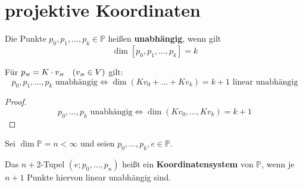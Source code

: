 \documentclass[parskip,a4paper,twoside,DIV15,BCOR12mm]{scrbook}
\begin{document}
\section{projektive Koordinaten}
\begin{definition}
Die Punkte \(p_{0},p_{1},\ldots,p_{k}\in\mathbb{P}\) heißen 
\textbf{unabhängig}, wenn gilt
\[
\dim[p_{0},p_{1},\ldots,p_{k}]=k
\]
\end{definition}
\begin{lemma}
Für \(p_{\varkappa}=K\cdot v_{\varkappa}\quad(v_{\varkappa}\in V)\) gilt:
\[
p_{0},p_{1},\ldots,p_{k}\text{ unabhängig}\Longleftrightarrow
    \dim(Kv_{0}+\ldots+Kv_{k})=k+1\text{ linear unabhängig}
\]
\end{lemma}
\begin{proof}
\[
p_{0},\ldots,p_{k}\text{ unabhängig}\Longleftrightarrow
    \dim(Kv_{0},\ldots,Kv_{k})=k+1
\]
\end{proof}
\begin{definition}
Sei \(\dim\mathbb{P}=n<\infty\) und seien \(p_{0},\ldots,p_{k},e\in\mathbb{P}\).

Das \(n+2\)-Tupel \((e;p_{0},\ldots,p_{n})\) heißt ein 
\textbf{Koordinatensystem} von \(\mathbb{P}\), wenn je \(n+1\) Punkte hiervon 
linear unabhängig sind.
\end{definition}
\end{document}
